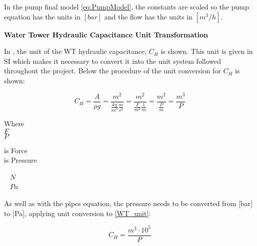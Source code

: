 In the pump final model \eqref{eq:PumpModel}, the constants are scaled so the pump equation has the units in $[bar]$ and the flow has the units in $[m^3/h]$.

\textbf{Water Tower Hydraulic Capacitance Unit Transformation}

In , the unit of the WT hydraulic capacitance, $C_H$ is shown. This unit is given in SI which makes it necessary to convert it into the unit system followed throughout the project. Below the procedure of the unit conversion for $C_H$ is shown: 

\begin{equation}
	C_H = \frac{A}{\rho g} = \frac{m^2}{\frac{kg}{m^3} \frac{m}{s^2}} = \frac{m^2}{\frac{F}{m^2} \frac{1}{m}} =  \frac{m^2}{\frac{P}{m}} = \frac{m^3}{P}
	\label{WT_unit}
\end{equation}

\begin{minipage}[t]{0.20\textwidth}
Where\\
\hspace*{8mm} $F$ \\
\hspace*{8mm} $P$ \\
\end{minipage}
\begin{minipage}[t]{0.68\textwidth}
\vspace*{2mm}
is Force\\
is Pressure\\
\end{minipage}
\begin{minipage}[t]{0.10\textwidth}
\vspace*{2mm}
\textcolor{White}{te}$\unit{N}$\\
\textcolor{White}{te}$\unit{Pa}$
\end{minipage}

As well as with the pipes equation, the pressure needs to be converted from [bar] to [Pa], applying unit conversion to \eqref{WT_unit}:

\begin{equation}
	C_H = \frac{m^{3} \cdot 10^5}{P}
	\label{WT_unit_final}
\end{equation}